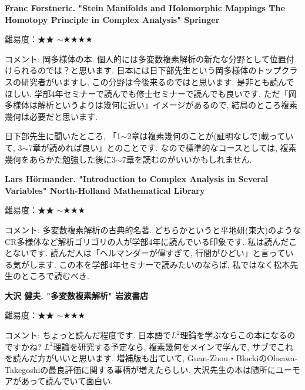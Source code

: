 \vspace{8pt}

\textbf{Franc Forstneric. "Stein Manifolds and Holomorphic Mappings
The Homotopy Principle in Complex Analysis" Springer}   \vspace{-6pt} 

難易度：★★ $\sim$★★★★ \vspace{-6pt} 

コメント: 岡多様体の本. 個人的には多変数複素解析の新たな分野として位置付けられるのでは？と思います. 日本には日下部先生という岡多様体のトップクラスの研究者がいますし, この分野は今後来るのではと思います. 
是非とも読んでほしい. 学部4年セミナーで読んでも修士セミナーで読んでも良いです.  ただ「岡多様体は解析というよりは幾何に近い」イメージがあるので, 結局のところ複素幾何は必要だと思います.

日下部先生に聞いたところ, 「1$\sim$2章は複素幾何のことが(証明なしで)載っていて, 3$\sim$7章が読めれば良い」とのことです. なので標準的なコースとしては, 複素幾何をあらかた勉強した後に3$\sim$7章を読むのがいいかもしれません. 
\vspace{8pt}

\textbf{Lars Hörmander. "Introduction to Complex Analysis in Several Variables" North-Holland Mathematical Library}   \vspace{-6pt} 

難易度：★★ $\sim$★★★ \vspace{-6pt} 

コメント: 多変数複素解析の古典的名著. どちらかというと平地研(東大)のようなCR多様体など解析ゴリゴリの人が学部4年に読んでいる印象です. 私は読んだことないです. 読んだ人は「ヘルマンダーが偉すぎて, 行間がひどい」と言っている気がします. 
この本を学部4年セミナーで読みたいのならば, 私ではなく松本先生のところで読むべき. 
\vspace{8pt}

\textbf{大沢 健夫. "多変数複素解析" 岩波書店}  　\vspace{-6pt} 

難易度：★★ $\sim$★★★ 　\vspace{-6pt} 

コメント: ちょっと読んだ程度です. 日本語で$L^2$理論を学ぶならこの本になるのですかね? $L^2$理論を研究する予定なら, 複素幾何をメインで学んで, サブでこれを読んだ方がいいと思います. 
増補版も出ていて, Guan-Zhou・BlockiのOhsawa-Takegoshiの最良評価に関する事柄が増えたらしい. 
大沢先生の本は随所にユーモアがあって読んでいて面白い. 

